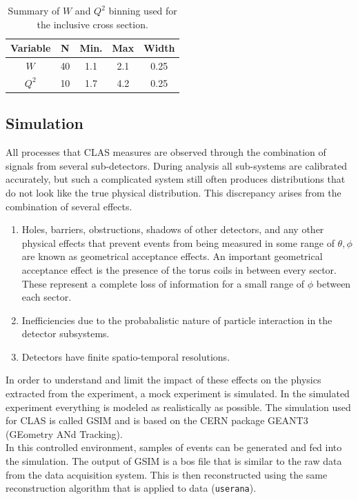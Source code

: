 \begin{table}
  \centering
  \begin{tabular}{c|c|c|c|c}
    Variable & N & Min. & Max & Width \\
    \hline 
    $W$   & 40 & 1.1 & 2.1 & 0.25 \\
    $Q^2$ & 10 & 1.7 & 4.2 & 0.25
  \end{tabular}
  \caption{Summary of $W$ and $Q^2$ binning used for the inclusive cross section.}
  \label{table:bins}
\end{table}

\subsection{Simulation}
All processes that CLAS measures are observed through the combination of signals from several sub-detectors.  During analysis all sub-systems are calibrated accurately, but such a complicated system still often produces distributions that do not look like the true physical distribution.  This discrepancy arises from the combination of several effects.

\begin{enumerate}
	\item Holes, barriers, obstructions, shadows of other detectors, and any other physical effects that prevent events from being measured in some range of $\theta, \phi$ are known as geometrical acceptance effects.  An important geometrical acceptance effect is the presence of the torus coils in between every sector.  These represent a complete loss of information for a small range of $\phi$ between each sector.
	\item Inefficiencies due to the probabalistic nature of particle interaction in the detector subsystems.
	\item Detectors have finite spatio-temporal resolutions.  
\end{enumerate}

In order to understand and limit the impact of these effects on the physics extracted from the experiment, a mock experiment is simulated.  In the simulated experiment everything is modeled as realistically as possible.  The simulation used for CLAS is called GSIM and is based on the CERN package GEANT3 (GEometry ANd Tracking).\\
In this controlled environment, samples of events can be generated and fed into the simulation.  The output of GSIM is a bos file that is similar to the raw data from the data acquisition system. This is then reconstructed using the same reconstruction algorithm that is applied to data (\texttt{userana}).  \\ 


